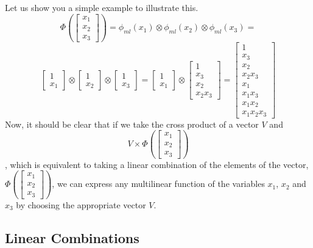 \documentclass{article}
\theoremstyle{definition}
\theoremstyle{definition}
\begin{document}
Let us show you a simple example to illustrate this.
\[
    \Phi(\begin{bmatrix}x_1 \\ x_2 \\ x_3 \end{bmatrix})
    =
    \phi_{ml}(x_1) \otimes \phi_{ml}(x_2) \otimes \phi_{ml}(x_3)
    =
\]
\[
\begin{bmatrix}
    1 \\ x_1
\end{bmatrix}
\otimes
\begin{bmatrix}
    1 \\ x_2
\end{bmatrix}
\otimes
\begin{bmatrix}
    1 \\ x_3
\end{bmatrix}
=
\begin{bmatrix}
    1 \\ x_1
\end{bmatrix}
\otimes
\begin{bmatrix}
    1 \\ x_3 \\ x_2 \\ x_2 x_3
\end{bmatrix}
=
\begin{bmatrix}
    1 \\ x_3 \\ x_2 \\ x_2 x_3 \\ x_1 \\ x_1 x_3 \\ x_1 x_2 \\ x_1 x_2 x_3
\end{bmatrix}
\]
Now, it should be clear that if we take the cross product of a vector $V$ and 
\[
    V \times \Phi(\begin{bmatrix}x_1 \\ x_2 \\ x_3 \end{bmatrix})
\]
, which is equivalent to taking a linear combination of the elements of the vector, 
$\Phi(\begin{bmatrix}x_1 \\ x_2 \\ x_3 \end{bmatrix})$, we can express any multilinear function of the variables $x_1$, $x_2$ and $x_3$ by choosing the appropriate vector $V$.
\subsection{Linear Combinations}
\end{document}
